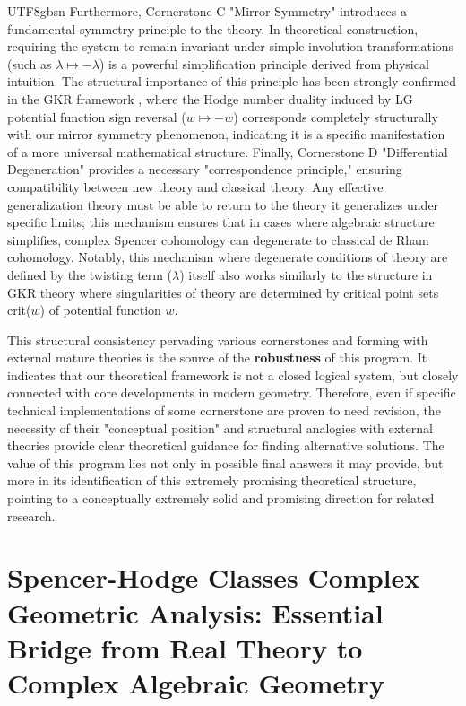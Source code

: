 \documentclass[a4paper,12pt]{extarticle}
\theoremstyle{definition}
\begin{document}
\begin{CJK}{UTF8}{gbsn}
Furthermore, Cornerstone C "Mirror Symmetry" introduces a fundamental symmetry principle to the theory. In theoretical construction, requiring the system to remain invariant under simple involution transformations (such as $\lambda \mapsto -\lambda$) is a powerful simplification principle derived from physical intuition. The structural importance of this principle has been strongly confirmed in the GKR framework \cite{gross2017towards}, where the Hodge number duality induced by LG potential function sign reversal ($w \mapsto -w$) corresponds completely structurally with our mirror symmetry phenomenon, indicating it is a specific manifestation of a more universal mathematical structure. Finally, Cornerstone D "Differential Degeneration" provides a necessary "correspondence principle," ensuring compatibility between new theory and classical theory. Any effective generalization theory must be able to return to the theory it generalizes under specific limits; this mechanism ensures that in cases where algebraic structure simplifies, complex Spencer cohomology can degenerate to classical de Rham cohomology. Notably, this mechanism where degenerate conditions of theory are defined by the twisting term ($\lambda$) itself also works similarly to the structure in GKR theory where singularities of theory are determined by critical point sets crit($w$) of potential function $w$.

This structural consistency pervading various cornerstones and forming with external mature theories is the source of the \textbf{robustness} of this program. It indicates that our theoretical framework is not a closed logical system, but closely connected with core developments in modern geometry. Therefore, even if specific technical implementations of some cornerstone are proven to need revision, the necessity of their "conceptual position" and structural analogies with external theories provide clear theoretical guidance for finding alternative solutions. The value of this program lies not only in possible final answers it may provide, but more in its identification of this extremely promising theoretical structure, pointing to a conceptually extremely solid and promising direction for related research.

\section{Spencer-Hodge Classes Complex Geometric Analysis: Essential Bridge from Real Theory to Complex Algebraic Geometry}
\label{sec:complex_geometric_analysis_essential}


\end{CJK}
\end{document}
